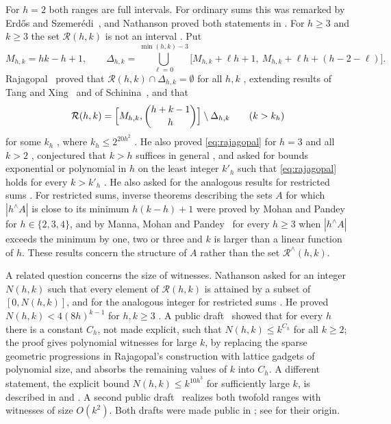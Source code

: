\documentclass[11pt]{amsart}
\theoremstyle{definition}
\theoremstyle{remark}
\numberwithin{equation}{section}
\newcommand{\R}{\mathcal{R}}
\newcommand{\Rr}{\mathcal{R}^{\wedge}}
\newcommand{\res}[2]{#1^{\wedge}#2}
\begin{document}
For $h=2$ both ranges are full intervals. For ordinary sums this was remarked by Erd\H{o}s and Szemer\'edi~\cite{ES83}, and Nathanson proved both statements in \cite[Theorems~5 and~6]{Nat25}. For $h\ge 3$ and $k\ge 3$ the set $\R(h,k)$ is not an interval \cite[Theorem~7]{Nat25}. Put
\[
M_{h,k}=hk-h+1,\qquad \Delta_{h,k}=\bigcup_{\ell=0}^{\min(h,k)-3}\bigl[M_{h,k}+\ell h+1,\ M_{h,k}+\ell h+(h-2-\ell)\bigr].
\]
Rajagopal~\cite{Raj26} proved that $\R(h,k)\cap\Delta_{h,k}=\emptyset$ for all $h,k$ \cite[Theorem~1.3]{Raj26}, extending results of Tang and Xing~\cite{TX21} and of Schinina~\cite{Sch26}, and that
\begin{equation}\label{eq:rajagopal}
\R(h,k)=\Bigl[M_{h,k},\binom{h+k-1}{h}\Bigr]\setminus\Delta_{h,k}\qquad (k>k_h)
\end{equation}
for some $k_h$ \cite[Theorem~1.4]{Raj26}, where $k_h\le 2^{20h^2}$ \cite[Remark~1.5]{Raj26}. He also proved \eqref{eq:rajagopal} for $h=3$ and all $k>2$ \cite[Theorem~1.7]{Raj26}, conjectured that $k>h$ suffices in general \cite[Conjecture~1.6]{Raj26}, and asked for bounds exponential or polynomial in $h$ on the least integer $k'_h$ such that \eqref{eq:rajagopal} holds for every $k>k'_h$ \cite[Section~5.1]{Raj26}. He also asked for the analogous results for restricted sums \cite[Section~5.3]{Raj26}. For restricted sums, inverse theorems describing the sets $A$ for which $|\res hA|$ is close to its minimum $h(k-h)+1$ were proved by Mohan and Pandey~\cite{MP24} for $h\in\{2,3,4\}$, and by Manna, Mohan and Pandey~\cite{MMP25} for every $h\ge 3$ when $|\res hA|$ exceeds the minimum by one, two or three and $k$ is larger than a linear function of $h$. These results concern the structure of $A$ rather than the set $\Rr(h,k)$.

A related question concerns the size of witnesses. Nathanson asked for an integer $N(h,k)$ such that every element of $\R(h,k)$ is attained by a subset of $[0,N(h,k)]$, and for the analogous integer for restricted sums \cite[Problems~2 and~3]{Nat25}. He proved $N(h,k)<4(8h)^{k-1}$ for $h,k\ge 3$ \cite[Theorem~8]{Nat26}. A public draft~\cite{PC} showed that for every $h$ there is a constant $C_h$, not made explicit, such that $N(h,k)\le k^{C_h}$ for all $k\ge 2$; the proof gives polynomial witnesses for large $k$, by replacing the sparse geometric progressions in Rajagopal's construction with lattice gadgets of polynomial size, and absorbs the remaining values of $k$ into $C_h$. A different statement, the explicit bound $N(h,k)\le k^{10h^3}$ for sufficiently large $k$, is described in \cite{GR26} and \cite[Remark~1.8]{Raj26}. A second public draft~\cite{QC} realizes both twofold ranges with witnesses of size $O(k^2)$. Both drafts were made public in \cite{GR26}; see \cite[Remark~1.8]{Raj26} for their origin.
\end{document}
